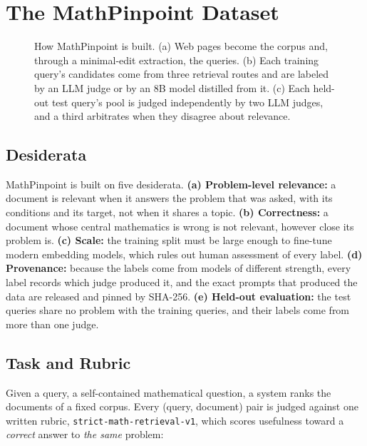 \section{The MathPinpoint Dataset}
\label{sec:benchmark}

\begin{figure}[t]
    \centering
    
    \caption{How MathPinpoint is built. (a) Web pages become the corpus and, through a minimal-edit extraction, the queries. (b) Each training query's candidates come from three retrieval routes and are labeled by an LLM judge or by an 8B model distilled from it. (c) Each held-out test query's pool is judged independently by two LLM judges, and a third arbitrates when they disagree about relevance.}
    \label{fig:pipeline}
\end{figure}

\subsection{Desiderata}
\label{sec:desiderata}

MathPinpoint is built on five desiderata. \textbf{(a) Problem-level relevance:} a document is relevant when it answers the problem that was asked, with its conditions and its target, not when it shares a topic. \textbf{(b) Correctness:} a document whose central mathematics is wrong is not relevant, however close its problem is. \textbf{(c) Scale:} the training split must be large enough to fine-tune modern embedding models, which rules out human assessment of every label. \textbf{(d) Provenance:} because the labels come from models of different strength, every label records which judge produced it, and the exact prompts that produced the data are released and pinned by SHA-256. \textbf{(e) Held-out evaluation:} the test queries share no problem with the training queries, and their labels come from more than one judge.

\subsection{Task and Rubric}
\label{sec:rubric}

Given a query, a self-contained mathematical question, a system ranks the documents of a fixed corpus. Every (query, document) pair is judged against one written rubric, \texttt{strict-math-retrieval-v1}, which scores usefulness toward a \emph{correct} answer to \emph{the same} problem:

